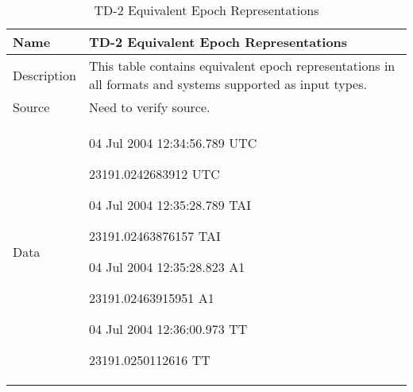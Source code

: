 

\begin{table}[htbp!]
\centering
      \begin{tabular}{|p{1.0 in} |p{5.0 in} |}
         \hline
          \rowcolor[rgb]{0.8,0.8,0.8}  Name & TD-2 Equivalent Epoch Representations\\
         \hline
         Description & This table contains equivalent epoch representations in all formats and systems supported
         as input types.    \\ \hline
         Source &  Need to verify source. \\
         \hline
         Data &
          \begin{compactenum}
              \item 04 Jul 2004 12:34:56.789 UTC
              \item 23191.0242683912 UTC
              \item 04 Jul 2004 12:35:28.789 TAI
              \item 23191.02463876157 TAI
              \item 04 Jul 2004 12:35:28.823 A1
              \item 23191.02463915951 A1
              \item  04 Jul 2004 12:36:00.973 TT
              \item 23191.0250112616 TT
          \end{compactenum}\\
         \hline
\end{tabular}
   \label{Table:TD-2}
   \caption{TD-2 Equivalent Epoch Representations}
\end{table}
